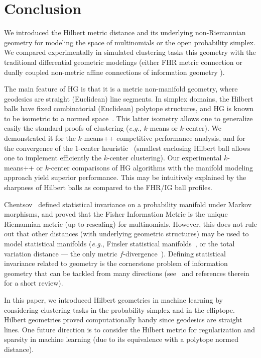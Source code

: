 \documentclass[graybox]{svmult}
\begin{document}
\section{Conclusion}\label{sec:con}

We introduced the Hilbert metric distance and its underlying non-Riemannian geometry
for modeling the space of multinomials or the open probability simplex.
We compared experimentally in simulated clustering tasks
this geometry with the traditional differential geometric modelings
(either FHR metric connection or dually coupled non-metric affine connections of information geometry \cite{IG-2016}).

The main feature of HG is that it is a metric non-manifold geometry, where geodesics are straight (Euclidean) line segments.
In simplex domains, the Hilbert balls have fixed combinatorial (Euclidean) polytope structures,
and HG is known to be isometric to a normed space~\cite{HilbertHarpe-1991,HilbertNormedSpace-2005}.
This latter isometry allows one to generalize easily the standard proofs of clustering ({\it e.g.}, $k$-means or $k$-center).
We demonstrated it for the $k$-means++ competitive performance analysis, and for the convergence of the $1$-center heuristic~\cite{bc-2003} (smallest enclosing Hilbert ball allows one to implement efficiently the $k$-center clustering).
Our experimental  $k$-means++ or $k$-center comparisons of HG algorithms with the  manifold modeling approach yield superior performance.
This may be intuitively explained by the sharpness of Hilbert balls as compared to the FHR/IG ball profiles.

Chentsov~\cite{cencov-2000} defined statistical invariance on a probability manifold under Markov morphisms, and proved that the Fisher Information Metric is the unique Riemannian metric (up to rescaling) for multinomials. However, this does not rule out that other distances (with underlying geometric structures) may be used to model statistical manifolds ({\it e.g.}, Finsler statistical manifolds~\cite{Cena-2002,FinslerIG-2016}, or the total variation distance --- the only metric $f$-divergence~\cite{L1metricfdiv-2007}). Defining statistical invariance related to geometry is the cornerstone problem of information geometry that can be tackled from many directions (see~\cite{statinvar-2017} and references therein for a short review). 

In this paper, we introduced Hilbert geometries in machine learning by considering clustering tasks in the probability simplex and in the elliptope.
Hilbert geometries proved computationally handy since geodesics are straight lines. 
One future direction is to consider the Hilbert metric for regularization and sparsity in machine learning (due to its equivalence with a polytope normed distance).
\vskip 0.5cm
\end{document}
